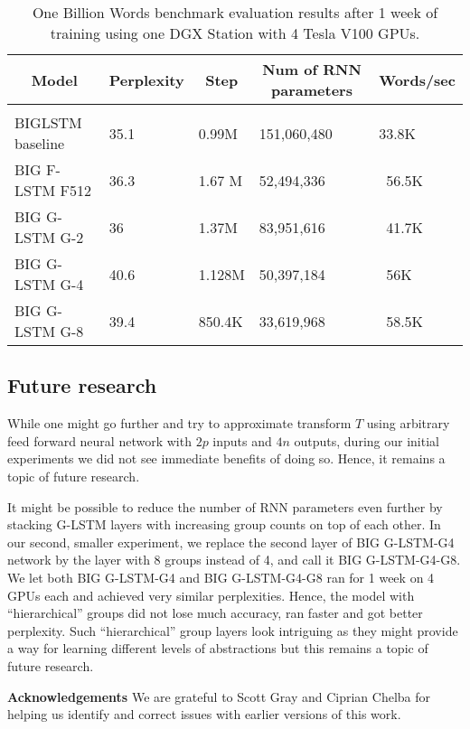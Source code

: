 \documentclass{article} \usepackage{iclr2017_workshop,times}
\begin{document}
\begin{table}[t]
\caption{One Billion Words benchmark evaluation results after 1 week of training using one DGX Station with 4 Tesla V100 GPUs.}
\label{1bwbm-1week}
\begin{center}
\begin{tabular}{lllll}
\multicolumn{1}{c}{\bf Model}  &\multicolumn{1}{c}{\bf Perplexity}  &\multicolumn{1}{c}{\bf Step} &\multicolumn{1}{c}{\bf Num of RNN parameters} &\multicolumn{1}{c}{\bf Words/sec}
\\ \hline \\
BIGLSTM baseline  & 35.1         & 0.99M & 151,060,480 & 33.8K\\
BIG F-LSTM F512   & 36.3         & 1.67 M & 52,494,336 & ~56.5K\\
BIG G-LSTM G-2    & 36           & 1.37M  & 83,951,616 & ~41.7K\\
BIG G-LSTM G-4    & 40.6         & 1.128M & 50,397,184 & ~56K\\
BIG G-LSTM G-8    & 39.4         & 850.4K & 33,619,968 & ~58.5K\\
\end{tabular}
\end{center}
\end{table}
\subsection{Future research}

While one might go further and try to approximate  transform $T$ using arbitrary feed forward neural network with $2p$ inputs and $4n$ outputs, during our initial experiments we did not see immediate benefits of doing so. Hence, it remains a topic of future research.

It might be possible to reduce the number of RNN parameters even further by stacking G-LSTM layers with increasing group counts on top of each other. 
In our second, smaller experiment, we replace the second layer of BIG G-LSTM-G4 network by the layer with 8 groups instead of 4, and call it BIG G-LSTM-G4-G8. We let both BIG G-LSTM-G4 and BIG G-LSTM-G4-G8 ran for 1 week on 4 GPUs each and achieved very similar perplexities. Hence, the model with ``hierarchical'' groups did not lose much accuracy, ran faster and got better perplexity. Such ``hierarchical'' group layers look intriguing as they might provide a way for learning different levels of abstractions but this remains a topic of future research.

{\bf Acknowledgements} 
We are grateful to Scott Gray and Ciprian Chelba for helping us identify and correct issues with earlier versions of this work.
\end{document}
